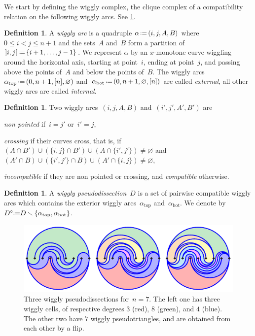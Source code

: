 \documentclass[submission]{FPSAC2025}
\theoremstyle{definition}
\newtheorem{definition}[theorem]{Definition}
\newcommand{\ssm}{\smallsetminus} %
\newcommand{\eqdef}{\mbox{\,\raisebox{0.2ex}{\scriptsize\ensuremath{\mathrm:}}\ensuremath{=}\,}} %
\newcommand{\darkblue}{\color{darkblue}} %
\newcommand{\defn}[1]{\textsl{\darkblue #1}} %
\begin{document}
We start by defining the wiggly complex, the clique complex of a compatibility relation on the following wiggly arcs.
See \cref{fig:pseudodissections}.

\begin{definition}
A \defn{wiggly arc} is a quadruple $\alpha \eqdef (i,j,A,B)$ where $0 \!\le\! i \!<\! j \!\le\! n+1$ and the sets~$A$ and~$B$ form a partition of~${]i,j[} \eqdef \{i+1, \dots, j-1\}$.
We represent $\alpha$ by an $x$-monotone curve wiggling around the horizontal axis, starting at point~$i$, ending at point~$j$, and passing above the points of~$A$ and below the points of~$B$.
The wiggly arcs~$\alpha_\mathrm{top} \eqdef (0, n+1, [n], \varnothing)$ and~$\alpha_\mathrm{bot} \eqdef (0, n+1, \varnothing, [n])$ are called \defn{external}, all other wiggly arcs are called \defn{internal}.
\end{definition}

\begin{definition}
\label{def:compatible}
Two wiggly arcs~$(i,j,A,B)$ and~$(i',j',A',B')$ are 
\begin{compactitem}
\item \defn{non pointed} if~$i = j'$ or~$i' = j$,
\item \defn{crossing} if their curves cross, that is, if $(A \cap B') \cup (\{i,j\} \cap B') \cup (A \cap \{i',j'\}) \ne \varnothing$ and $(A' \cap B) \cup (\{i',j'\} \cap B) \cup (A' \cap \{i,j\})\ne \varnothing$,
\item \defn{incompatible} if they are non pointed or crossing, and \defn{compatible} otherwise.
\end{compactitem}
%
\end{definition}

\begin{definition}
A \defn{wiggly pseudodissection}~$D$ is a set of pairwise compatible wiggly arcs which contains the exterior wiggly arcs~$\alpha_\mathrm{top}$ and~$\alpha_\mathrm{bot}$. We denote by~$D^\circ \!\eqdef\! D \ssm \{\alpha_\mathrm{top}, \alpha_\mathrm{bot}\}$.

\begin{figure}[b]
\centerline{\includegraphics[scale=1.4]{wigglyPseudodissections}}
\caption{Three wiggly pseudodissections for~$n = 7$. The left one has three wiggly cells, of respective degrees $3$ (red), $8$ (green), and $4$ (blue). The other two have $7$ wiggly pseudotriangles, and are obtained from each other by a flip.}
\label{fig:pseudodissections}
\end{figure}
\end{definition}
\end{document}
